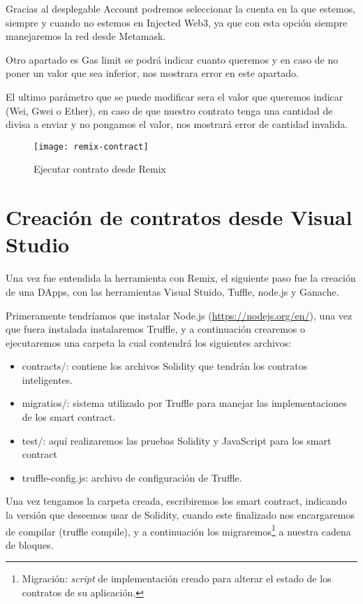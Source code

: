 Gracias al desplegable Account podremos seleccionar la cuenta en la que estemos, siempre y cuando no estemos en Injected Web3, ya que con esta opción siempre manejaremos la red desde Metamask.

Otro apartado es Gas limit se podrá indicar cuanto queremos y en caso de no poner un valor que sea inferior, nos mostrara error en este apartado. 

El ultimo parámetro que se puede modificar sera el valor que queremos indicar (Wei, Gwei o Ether), en caso de que nuestro contrato tenga una cantidad de divisa a enviar y no pongamos el valor, nos mostrará error de cantidad invalida.  

\begin{figure}[h]
  \centering
  \texttt{[image: remix-contract]}
  \caption{Ejecutar contrato desde Remix}
\end{figure}  

\section{Creación de contratos desde Visual Studio}

Una vez fue entendida la herramienta con Remix, el siguiente paso fue la creación de una DApps, con las herramientas Visual Stuido, Tuffle, node.js y Ganache.

Primeramente tendríamos que instalar Node.js (\url{https://nodejs.org/en/}), una vez que fuera instalada instalaremos Truffle, y a continuación crearemos o ejecutaremos una carpeta  la cual contendrá los siguientes archivos:
\begin{itemize}
	\item contracts/: contiene los archivos Solidity que tendrán los contratos inteligentes.
	\item migratios/: sistema utilizado por Truffle para manejar las implementaciones de los smart contract. 
	\item test/: aquí realizaremos las pruebas Solidity y JavaScript para los smart contract
	\item truffle-config.js: archivo de configuración de Truffle.
\end{itemize}

Una vez tengamos la carpeta creada, escribiremos los smart contract, indicando la versión que deseemos usar de Solidity, cuando este finalizado nos encargaremos de compilar (truffle compile), y a continuación los migraremos\footnote{Migración: \textit{script} de implementación creado para alterar el estado de los contratos de su aplicación.} a nuestra cadena de bloques.

